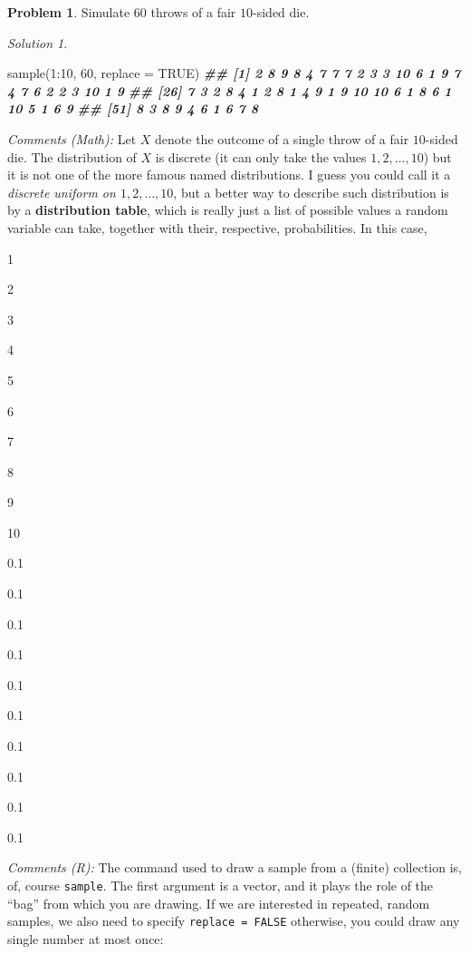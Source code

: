 \documentclass[
]{book}
\newenvironment{Shaded}{\begin{snugshade}}{\end{snugshade}}
\newcommand{\AttributeTok}[1]{\textcolor[rgb]{0.77,0.63,0.00}{#1}}
\newcommand{\ConstantTok}[1]{\textcolor[rgb]{0.00,0.00,0.00}{#1}}
\newcommand{\DecValTok}[1]{\textcolor[rgb]{0.00,0.00,0.81}{#1}}
\newcommand{\DocumentationTok}[1]{\textcolor[rgb]{0.56,0.35,0.01}{\textbf{\textit{#1}}}}
\newcommand{\FunctionTok}[1]{\textcolor[rgb]{0.00,0.00,0.00}{#1}}
\newcommand{\NormalTok}[1]{#1}
\newcommand{\SpecialCharTok}[1]{\textcolor[rgb]{0.00,0.00,0.00}{#1}}
\theoremstyle{definition}
\theoremstyle{definition}
\theoremstyle{definition}
\newtheorem{exercise}{Problem}[chapter]
\theoremstyle{definition}
\theoremstyle{remark}
\newtheorem*{solution}{Solution}
\begin{document}
\begin{exercise}
Simulate \(60\) throws of a fair \(10\)-sided die.
\end{exercise}

\begin{solution}
~

\begin{Shaded}
\begin{Highlighting}[]
\FunctionTok{sample}\NormalTok{(}\DecValTok{1}\SpecialCharTok{:}\DecValTok{10}\NormalTok{, }\DecValTok{60}\NormalTok{, }\AttributeTok{replace =} \ConstantTok{TRUE}\NormalTok{)}
\DocumentationTok{\#\#  [1]  2  8  9  8  4  7  7  7  2  3  3 10  6  1  9  7  4  7  6  2  2  3 10  1  9}
\DocumentationTok{\#\# [26]  7  3  2  8  4  1  2  8  1  4  9  1  9 10 10  6  1  8  6  1 10  5  1  6  9}
\DocumentationTok{\#\# [51]  8  3  8  9  4  6  1  6  7  8}
\end{Highlighting}
\end{Shaded}

\emph{Comments (Math):} Let \(X\) denote the outcome of a single throw of a fair \(10\)-sided die.
The distribution of \(X\) is discrete (it can only take the values
\(1,2,\dots, 10\)) but it is not one of the more famous named distributions. I
guess you could call it a \emph{discrete uniform on \({1,2,\dots, 10}\)}, but a better
way to describe such distribution is by a \textbf{distribution table}, which is
really just a list of possible values a random variable can take, together with
their, respective, probabilities. In this case,

1

2

3

4

5

6

7

8

9

10

0.1

0.1

0.1

0.1

0.1

0.1

0.1

0.1

0.1

0.1

\emph{Comments (R):} The command used to draw a sample from a (finite) collection is, of, course
\texttt{sample}. The first argument is a vector, and it plays the role of the ``bag''
from which you are drawing. If we are interested in repeated, random samples, we
also need to specify \texttt{replace\ =\ FALSE} otherwise, you could draw any single
number at most once:


\end{solution}
\end{document}

